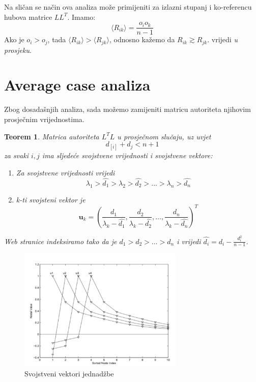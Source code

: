 \documentclass[11pt]{article}
\newtheorem{theorem}{Teorem}[section]
\begin{document}
Na sličan se način ova analiza može primijeniti za izlazni stupanj i ko-referencu hubova matrice $LL^{T}$.
Imamo:
\begin{equation*}
    \langle R_{ik} \rangle = \frac{o_{i} o_{k}}{n-1}
\end{equation*}
Ako je $o_{i} > o_{j}$, tada $\langle R_{ik} \rangle > \langle R_{jk} \rangle$, odnosno kažemo da  $R_{ik} \gtrsim R_{jk}$. vrijedi \emph{u prosjeku}.





\section{Average case analiza}
Zbog dosadašnjih analiza, sada možemo zamijeniti matricu autoriteta njihovim prosječnim vrijednostima. 
\begin{theorem}
Matrica autoriteta $L^{T}L$ u prosječnom slučaju, uz uvjet 
\begin{equation}
    d_[i]+d_{j}<n+1
\end{equation} za svaki $i,j$ ima sljedeće svojstvene vrijednosti i svojstvene vektore:
\begin{enumerate}
\item Za svojstvene vrijednosti vrijedi
\begin{equation}
\lambda_{1} > \hat{d_{1}}>\lambda_{2}>\hat{d_{2}}>\dots >\lambda_{n}>\hat{d_{n}}
\end{equation}
\item k-ti svojsteni vektor je
\begin{equation} \label{eq:15}
\textbf{u}_{k}= \left(\frac{d_{1}}{\lambda_{k}-\hat{d_{1}}},\frac{d_{2}}{\lambda_{k}-\hat{d_{2}}},\dots, \frac{d_{n}}{\lambda_{k}-\hat{d_{n}}} \right)^{T}
\end{equation}
\end{enumerate}
Web stranice indeksiramo tako da je $d_{1}>d_{2}>\dots>d_{n}$ i vrijedi $\hat{d_{i}} = d_{i} - \frac{d_{i}^{2}}{n-1}$.
\end{theorem}

\begin{figure}[ht!]
\centering
\includegraphics[width=0.7\textwidth]{svvektori.png}  
\caption{Svojstveni vektori jednadžbe \label{eq:15}}
\end{figure}
\end{document}
